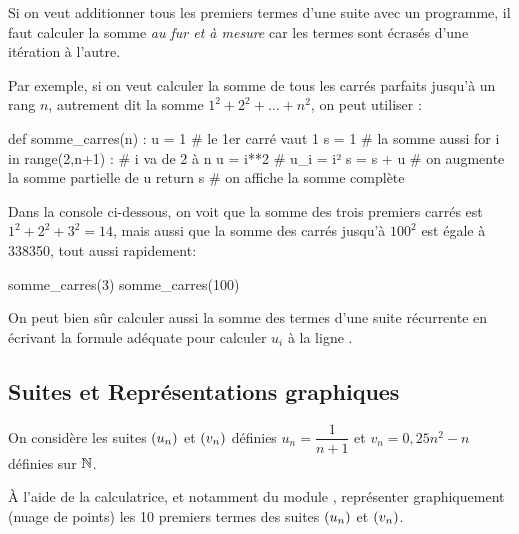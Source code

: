 \documentclass[a4paper,11pt]{article}
\begin{document}
\begin{calgo}
Si on veut additionner tous les premiers termes d'une suite avec un programme, il faut calculer la somme \textit{au fur et à mesure} car les termes sont écrasés d'une itération à l'autre.

Par exemple, si on veut calculer la somme de tous les carrés parfaits jusqu'à un rang $n$, autrement dit la somme $1^2+2^2+\dots+n^2$, on peut utiliser :

\begin{envpython}[15cm]
def somme_carres(n) :
	u = 1                       # le 1er carré vaut 1
	s = 1                       # la somme aussi
	for i in range(2,n+1) :     # i va de 2 à n
		u = i**2                # u_i = i²
		s = s + u               # on augmente la somme partielle de u
	return s                    # on affiche la somme complète
\end{envpython}

Dans la console ci-dessous, on voit que la somme des trois premiers carrés est $1^2+ 2^2+ 3^2= 14$, mais aussi que la somme des carrés jusqu'à $100^2$ est égale à \num{338350}, tout aussi rapidement:

\begin{consolepython}[15cm]
\begin{pyconsole}[][framesep=3mm,frame=single,label={[\scriptsize Début de la console \logopython]\scriptsize Fin de la console \logopython},fontsize=\footnotesize,framerule=1pt,rulecolor=\color{ForestGreen}]
somme_carres(3)
somme_carres(100)
\end{pyconsole}
\end{consolepython}
On peut bien sûr calculer aussi la somme des termes d'une suite récurrente en écrivant la formule adéquate pour calculer $u_i$ à la ligne .
\end{calgo}

\newpage

\subsection{Suites et Représentations graphiques}

\begin{cmanip}
On considère les suites $\suiten$ et $\suiten[v]$ définies $u_n = \dfrac{1}{n+1}$ et $v_n = 0,25n^2-n$ définies sur $\N$.

À l'aide de la calculatrice, et notamment du module , représenter graphiquement (nuage de points) les 10 premiers termes des suites $\suiten$ et $\suiten[v]$.
\end{cmanip}
\end{document}
